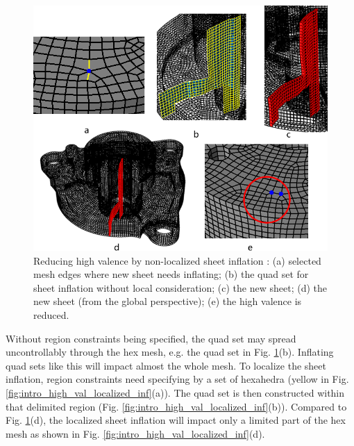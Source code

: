 \documentclass[final,5p,times,twocolumn]{elsarticle}
\begin{document}
\begin{figure}[htbp]
\begin{center}
\includegraphics[width=12cm]{intro_high_val_whole.png}
\caption{Reducing high valence by non-localized sheet inflation : (a) selected mesh edges where new sheet needs inflating; (b) the quad set for sheet inflation without local consideration; (c) the new sheet; (d) the new sheet (from the global perspective); (e) the high valence is reduced.}
\label{fig:intro_high_val_whole}
\end{center}
\end{figure}

Without region constraints being specified, the quad set may spread uncontrollably through the hex mesh, e.g. the quad set in Fig. \ref{fig:intro_high_val_whole}(b). Inflating quad sets like this will impact almost the whole mesh. To localize the sheet inflation, region constraints need specifying by a set of hexahedra (yellow in Fig. \ref{fig:intro_high_val_localized_inf}(a)). The quad set is then constructed within that delimited region (Fig. \ref{fig:intro_high_val_localized_inf}(b)). Compared to Fig. \ref{fig:intro_high_val_whole}(d), the localized sheet inflation will impact only a limited part of the hex mesh as shown in Fig. \ref{fig:intro_high_val_localized_inf}(d).
\end{document}
